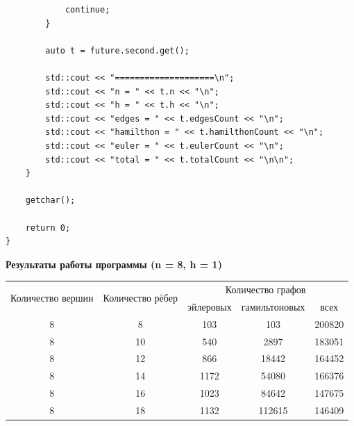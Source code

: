 \documentclass[a4paper,14pt]{extarticle}
\begin{document}
\begin{enumerate}[1.]
\begin{verbatim}
            continue;
        }

        auto t = future.second.get();

        std::cout << "====================\n";
        std::cout << "n = " << t.n << "\n";
        std::cout << "h = " << t.h << "\n";
        std::cout << "edges = " << t.edgesCount << "\n";
        std::cout << "hamilthon = " << t.hamilthonCount << "\n";
        std::cout << "euler = " << t.eulerCount << "\n";
        std::cout << "total = " << t.totalCount << "\n\n";
    }

    getchar();

    return 0;
}
\end{verbatim}
          \begin{center}\textbf{Результаты работы программы (n = 8, h = 1)}\end{center}
          \begin{tabular}{|c|c|c|c|c|}
              \hline
              \multirow{2}{*}{Количество вершин} & \multirow{2}{*}{Количество рёбер} & \multicolumn{3}{|c|}{Количество графов}                          \\
              \cline{3-5}
                                                 &                                   & эйлеровых                               & гамильтоновых & всех   \\
              \hline
              8                                  & 8                                 & 103                                     & 103           & 200820 \\
              \hline
              8                                  & 10                                & 540                                     & 2897          & 183051 \\
              \hline
              8                                  & 12                                & 866                                     & 18442         & 164452 \\
              \hline
              8                                  & 14                                & 1172                                    & 54080         & 166376 \\
              \hline
              8                                  & 16                                & 1023                                    & 84642         & 147675 \\
              \hline
              8                                  & 18                                & 1132                                    & 112615        & 146409 \\

\end{tabular}
\end{enumerate}
\end{document}
